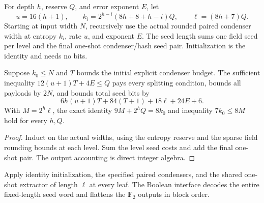 \begin{definition}
  \label{def:lowerbounds-algebraic-near-halving-parameters}
  \leanok
  For depth $h$, reserve $Q$, and error exponent $E$, let
  \[
    u=16(h+1),\qquad
    k_i=2^{h-i}(8h+8+h-i)Q,\qquad \ell=(8h+7)Q.
  \]
  Starting at input width $N$, recursively use the actual rounded paired
  condenser width at entropy $k_i$, rate $u$, and exponent $E$.
  The seed length sums one field seed per level and the final one-shot
  condenser/hash seed pair. Initialization is the identity and needs no bits.
\end{definition}

\begin{theorem}
  \label{thm:lowerbounds-algebraic-near-halving-parameters}
  \leanok
  Suppose $k_0\le N$ and $T$ bounds the initial explicit condenser budget.
  The sufficient inequality $12(u+1)T+4E\le Q$ pays every splitting
  condition, bounds all payloads by $2N$, and bounds total seed bits by
  \[
    6h(u+1)T+84(T+1)+18\ell+24E+6.
  \]
  With $M=2^h\ell$, the exact identity $9M+2^hQ=8k_0$ and inequality
  $7k_0\le8M$ hold for every $h,Q$.
\end{theorem}
\begin{proof}
  \leanok
  Induct on the actual widths, using the entropy reserve and the sparse
  field rounding bounds at each level. Sum the level seed costs and add
  the final one-shot pair. The output accounting is direct integer algebra.
\end{proof}

\begin{definition}
  \label{def:lowerbounds-algebraic-near-halving-extractor}
  \leanok
  Apply identity initialization, the specified paired condensers, and the
  shared one-shot extractor of length $\ell$ at every leaf. The Boolean
  interface decodes the entire fixed-length seed word and flattens the
  $\mathbf F_2$ outputs in block order.
\end{definition}

